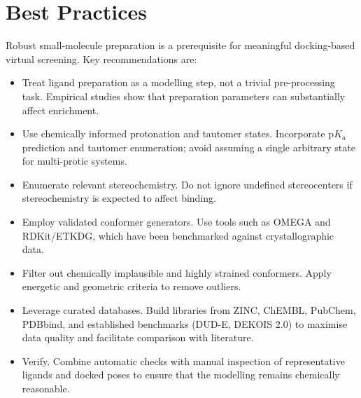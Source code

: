 \documentclass[12pt]{article}
\begin{document}
\section{Best Practices}

Robust small-molecule preparation is a prerequisite for meaningful docking-based virtual screening. Key recommendations are:

\begin{itemize}
  \item Treat ligand preparation as a modelling step, not a trivial pre-processing task. Empirical studies show that preparation parameters can substantially affect enrichment. 
  \item Use chemically informed protonation and tautomer states. Incorporate p$K_a$ prediction and tautomer enumeration; avoid assuming a single arbitrary state for multi-protic systems.
  \item Enumerate relevant stereochemistry. Do not ignore undefined stereocenters if stereochemistry is expected to affect binding.
  \item Employ validated conformer generators. Use tools such as OMEGA and RDKit/ETKDG, which have been benchmarked against crystallographic data.
  \item Filter out chemically implausible and highly strained conformers. Apply energetic and geometric criteria to remove outliers.
  \item Leverage curated databases. Build libraries from ZINC, ChEMBL, PubChem, PDBbind, and established benchmarks (DUD-E, DEKOIS 2.0) to maximise data quality and facilitate comparison with literature.
  \item Verify. Combine automatic checks with manual inspection of representative ligands and docked poses to ensure that the modelling remains chemically reasonable.
\end{itemize}



\end{document}
